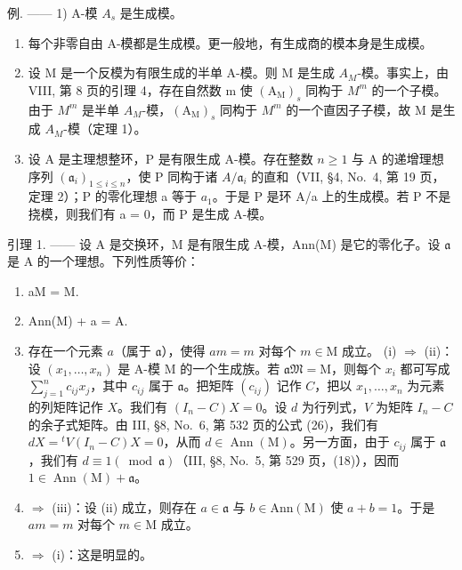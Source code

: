 例. —— 1) A-模 \(A_s\) 是生成模。

\begin{enumerate}
\def\labelenumi{\arabic{enumi})}
\setcounter{enumi}{1}
\item
  每个非零自由 A-模都是生成模。更一般地，有生成商的模本身是生成模。
\item
  设 M 是一个反模为有限生成的半单 A-模。则 M 是生成 \(A_{M}\)-模。事实上，由 VIII, 第 8 页的引理 4，存在自然数 m 使 \((\mathrm{A}_{\mathrm{M}})_{s}\) 同构于 \(M^{m}\) 的一个子模。由于 \(M^{m}\) 是半单 \(A_{M}\)-模，\((\mathrm{A}_{\mathrm{M}})_{s}\) 同构于 \(M^{m}\) 的一个直因子子模，故 M 是生成 \(A_{M}\)-模（定理 1）。
\item
  设 A 是主理想整环，P 是有限生成 A-模。存在整数 \(n \geqslant 1\) 与 A 的递增理想序列 \((\mathfrak{a}_{i})_{1 \leqslant i \leqslant n}\)，使 P 同构于诸 \(A/\mathfrak{a}_{i}\) 的直和（VII, §4, No.~4, 第 19 页，定理 2）；P 的零化理想 a 等于 \(a_{1}\)。于是 P 是环 A/a 上的生成模。若 P 不是挠模，则我们有 a = 0，而 P 是生成 A-模。
\end{enumerate}

引理 1. —— 设 A 是交换环，M 是有限生成 A-模，Ann(M) 是它的零化子。设 \(\mathfrak{a}\) 是 A 的一个理想。下列性质等价：

\begin{enumerate}
\def\labelenumi{(\roman{enumi})}
\item
  aM = M.
\item
  Ann(M) + a = A.
\item
  存在一个元素 \(a\)（属于 \(\mathfrak{a}\)），使得 \(am = m\) 对每个 \(m \in \mathrm{M}\) 成立。 (i) \(\Rightarrow\) (ii)：设 \((x_1, \ldots, x_n)\) 是 A-模 M 的一个生成族。若 \(\mathfrak{aM} = \mathrm{M}\)，则每个 \(x_i\) 都可写成 \(\sum_{j=1}^{n} c_{ij} x_j\)，其中 \(c_{ij}\) 属于 \(\mathfrak{a}\)。把矩阵 \((c_{ij})\) 记作 \(C\)，把以 \(x_1, \ldots, x_n\) 为元素的列矩阵记作 \(X\)。我们有 \((I_n - C)X = 0\)。设 \(d\) 为行列式，\(V\) 为矩阵 \(I_n - C\) 的余子式矩阵。由 III, §8, No.~6, 第 532 页的公式 (26)，我们有 \(dX = {}^t V(I_n - C)X = 0\)，从而 \(d \in \operatorname{Ann}(\mathrm{M})\)。另一方面，由于 \(c_{ij}\) 属于 \(\mathfrak{a}\)，我们有 \(d \equiv 1 (\bmod \mathfrak{a})\)（III, §8, No.~5, 第 529 页，(18)），因而 \(1 \in \operatorname{Ann}(\mathrm{M}) + \mathfrak{a}\)。
\item
  \(\Rightarrow\) (iii)：设 (ii) 成立，则存在 \(a\in \mathfrak{a}\) 与 \(b\in \mathrm{Ann}(\mathrm{M})\) 使 \(a + b = 1\)。于是 \(am = m\) 对每个 \(m\in \mathrm{M}\) 成立。
\item
  \(\Rightarrow\) (i)：这是明显的。
\end{enumerate}

